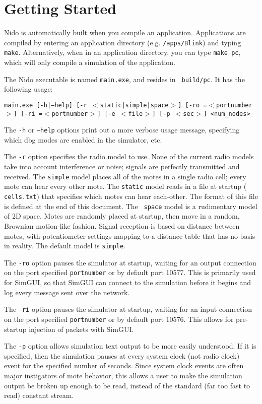 \documentclass[10pt]{article}
\begin{document}
\section*{Getting Started}

Nido is automatically built when you compile an
application. Applications are compiled by entering an application
directory (e.g. {\tt /apps/Blink}) and typing {\tt
make}. Alternatively, when in an application directory, you can type
{\tt make pc}, which will only compile a simulation of the application.

The Nido executable is named {\tt main.exe}, and resides in {\tt
build/pc}. It has the following usage:


{\tt main.exe [-h|--help] [-r $<$static|simple|space$>$] [-ro
=$<$portnumber$>$] [-ri =$<$portnumber$>$] [-e $<$file$>$] [-p $<$sec$>$] <num\_nodes>}

The {\tt -h} or {\tt --help} options print out a more verbose usage
message, specifying which dbg modes are enabled in the simulator, etc.

The {\tt -r} option specifies the radio model to use. None of the
current radio models take into account interference or noise; signals
are perfectly transmitted and received. The {\tt simple} model places
all of the motes in a single radio cell; every mote can hear every
other mote. The {\tt static} model reads in a file at startup ({\tt
cells.txt}) that specifies which motes can hear each-other. The
format of this file is defined at the end of this document. The {\tt
space} model is a rudimentary model of 2D space. Motes are randomly
placed at startup, then move in a random, Brownian motion-like
fashion. Signal reception is based on distance between motes, with
potentiometer settings mapping to a distance table that has no basis
in reality. The default model is {\tt simple}.

The {\tt -ro} option pauses the simulator at startup, waiting for an
output connection on the port specified {\tt portnumber} or by default
port 10577. This is primarily used for SimGUI, so that SimGUI
can connect to the simulation before it begins and log
every message sent over the network.

The {\tt -ri} option pauses the simulator at startup, waiting for an
input connection on the port specified {\tt portnumber} or by default
port 10576. This allows for pre-startup injection of packets with SimGUI. 

The {\tt -p} option allows simulation text output to be more easily
understood. If it is specified, then the simulation pauses at every
system clock (not radio clock) event for the specified number of
seconds. Since system clock events are often major instigators of mote
behavior, this allows a user to make the simulation output be broken
up enough to be read, instead of the standard (far too fast to read)
constant stream.
\end{document}
